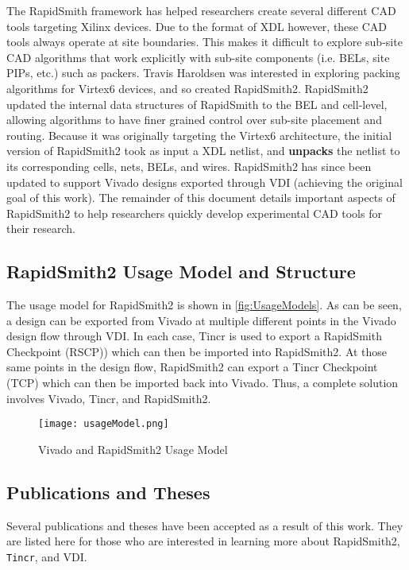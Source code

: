 The RapidSmith framework has helped researchers create several different CAD
tools targeting Xilinx devices. Due to the format of XDL however, these CAD
tools always operate at site boundaries. This makes it difficult to explore sub-site CAD
algorithms that work explicitly with sub-site components (i.e. BELs, site PIPs,
etc.) such as packers. Travis Haroldsen was interested in exploring packing
algorithms for Virtex6 devices, and so created RapidSmith2. RapidSmith2 updated
the internal data structures of RapidSmith to the BEL and cell-level, allowing
algorithms to have finer grained control over sub-site placement and routing. 
Because it was originally targeting the Virtex6 architecture, the initial
version of RapidSmith2 took as input a XDL netlist, and \textbf{unpacks} the
netlist to its corresponding cells, nets, BELs, and wires. RapidSmith2 has
since been updated to support Vivado designs exported through VDI (achieving
the original goal of this work). The remainder of this document details
important aspects of RapidSmith2 to help researchers quickly develop
experimental CAD tools for their research.

\subsection{RapidSmith2 Usage Model and Structure}
The usage model for RapidSmith2 is shown in \autoref{fig:UsageModels}.  As can be
seen, a design can be exported from Vivado at multiple different points in the
Vivado design flow through VDI. In each case, Tincr is used to export a
RapidSmith Checkpoint (RSCP)) which can then be imported into RapidSmith2.  At
those same points in the design flow, RapidSmith2 can export a Tincr Checkpoint
(TCP) which can then be imported back into Vivado. Thus, a complete solution
involves Vivado, Tincr, and RapidSmith2.

\begin{figure}[htb]
\centering
\texttt{[image: usageModel.png]}
\caption{Vivado and RapidSmith2 Usage Model}
\label{fig:UsageModels}
\end{figure}

\subsection{Publications and Theses}
Several publications and theses have been accepted as a result of this work.
They are listed here for those who are interested in learning more about RapidSmith2,
\texttt{Tincr}, and VDI.

